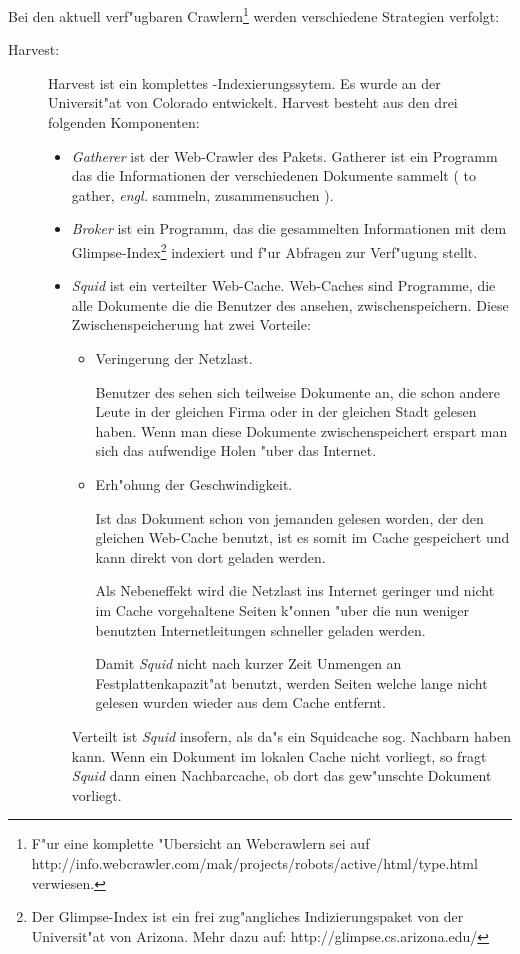 Bei den aktuell verf"ugbaren Crawlern\footnote{\raggedright F"ur eine komplette "Ubersicht an Webcrawlern sei auf http://info.webcrawler.com/mak/projects/robots/active/html/type.html verwiesen.} werden verschiedene Strategien verfolgt:
\begin{description}

\item[Harvest:] Harvest ist ein komplettes \www-Indexierungssytem. Es wurde an der Universit"at von Colorado entwickelt. Harvest besteht aus den drei folgenden Komponenten: 
	\begin{itemize}
		\item {\em Gatherer} ist der Web-Crawler des Pakets. Gatherer ist ein Programm das die Informationen der verschiedenen Dokumente sammelt ( to gather, {\em engl.} sammeln, zusammensuchen ). 
		\item {\em Broker} ist ein Programm, das die gesammelten Informationen mit dem Glimpse-Index\footnote{Der Glimpse-Index ist ein frei zug"angliches Indizierungspaket von der Universit"at von Arizona. Mehr dazu auf: http://glimpse.cs.arizona.edu/} indexiert und f"ur Abfragen zur Verf"ugung stellt.
		\item {\em Squid} ist ein verteilter Web-Cache. Web-Caches sind Programme, die alle Dokumente die die Benutzer des \www ansehen, zwischenspeichern. Diese Zwischenspeicherung hat zwei Vorteile:
		\begin{itemize}
			\item Veringerung der Netzlast. 
			
			Benutzer des \www sehen sich teilweise Dokumente an, die schon andere Leute in der gleichen Firma oder in der gleichen Stadt gelesen haben. Wenn man diese Dokumente zwischenspeichert erspart man sich das aufwendige Holen "uber das Internet.  
			
			\item Erh"ohung der Geschwindigkeit.
			
			Ist das Dokument schon von jemanden gelesen worden, der den gleichen Web-Cache benutzt, ist es somit im Cache gespeichert und kann direkt von dort geladen werden.
		
			Als Nebeneffekt wird die Netzlast ins Internet geringer und nicht im Cache vorgehaltene Seiten k"onnen "uber die nun weniger benutzten Internetleitungen schneller geladen werden.
			 
			Damit {\em Squid} nicht nach kurzer Zeit Unmengen an Festplattenkapazit"at benutzt, werden Seiten welche lange nicht gelesen wurden wieder aus dem Cache entfernt.
		\end{itemize}
	Verteilt ist {\em Squid} insofern, als da"s ein Squidcache sog. Nachbarn haben kann. Wenn ein Dokument im lokalen Cache nicht vorliegt, so fragt {\em Squid} dann einen Nachbarcache, ob dort das gew"unschte Dokument vorliegt.
	\end{itemize}
	

\end{description}
